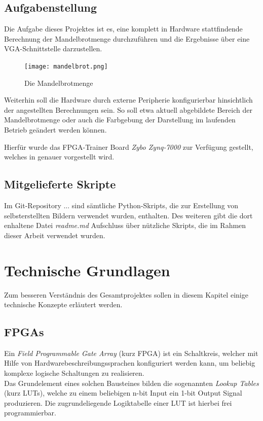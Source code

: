 \documentclass[a4paper,12pt,onesided]{report}
\begin{document}
\section{Aufgabenstellung}
\label{sec:aufgabenstellung}
Die Aufgabe dieses Projektes ist es, eine komplett in Hardware stattfindende Berechnung der Mandelbrotmenge durchzuführen und die Ergebnisse über eine VGA-Schnittstelle darzustellen.

\begin{figure}[H]
	\centering
	\texttt{[image: mandelbrot.png]}
	\caption{Die Mandelbrotmenge}
	\label{fig:mandelbrotmenge}
\end{figure}

Weiterhin soll die Hardware durch externe Peripherie konfigurierbar hinsichtlich der angestellten Berechnungen sein. So soll etwa aktuell abgebildete Bereich der Mandelbrotmenge oder auch die Farbgebung der Darstellung im laufenden Betrieb geändert werden können.

Hierfür wurde das FPGA-Trainer Board \textit{Zybo Zynq-7000} zur Verfügung gestellt, welches in %
genauer vorgestellt wird.

\section{Mitgelieferte Skripte}
Im Git-Repository ... sind sämtliche Python-Skripts, die zur Erstellung von selbsterstellten Bildern verwendet wurden, enthalten. Des weiteren gibt die dort enhaltene Datei \textit{readme.md} Aufschluss über nützliche Skripts, die im Rahmen dieser Arbeit verwendet wurden.

\chapter{Technische Grundlagen}
Zum besseren Verständnis des Gesamtprojektes sollen in diesem Kapitel einige technische Konzepte erläutert werden.

\section{FPGAs}
\label{sec:fpga}
Ein \textit{Field Programmable Gate Array} (kurz FPGA) ist ein Schaltkreis, welcher mit Hilfe von Hardwarebeschreibungssprachen %
konfiguriert werden kann, um beliebig komplexe logische Schaltungen zu realisieren.\\
Das Grundelement eines solchen Bausteines bilden die sogenannten \textit{Lookup Tables} (kurz LUTs), welche zu einem beliebigen n-bit Input ein 1-bit Output Signal produzieren. Die zugrundeliegende Logiktabelle einer LUT ist hierbei frei programmierbar.
\end{document}
